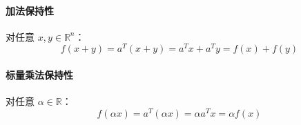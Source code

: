 \paragraph{加法保持性}  
对任意 \(x, y \in \mathbb{R}^n\)：
\[
f(x + y) = a^T(x + y) = a^T x + a^T y = f(x) + f(y)
\]

\paragraph{标量乘法保持性}  
对任意 \(\alpha \in \mathbb{R}\)：
\[
f(\alpha x) = a^T(\alpha x) = \alpha a^T x = \alpha f(x)
\]